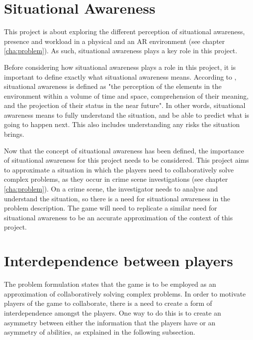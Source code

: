 
	\section{Situational Awareness} \label{sec:awareness}
		This project is about exploring the different perception of situational
		awareness, presence and workload in a physical and an AR environment
		(see chapter \ref{cha:problem}). As such, situational awareness plays a
		key role in this project.

		Before considering how situational awareness plays a role in this project,
		it is important to define exactly what situational awareness means.
		According to \cite{endsley}, situational awareness is defined as "the
		perception of the elements in the environment within a volume of time and
		space, comprehension of their meaning, and the projection of their status in
		the near future". In other words, situational awareness means to
		fully understand the situation, and be able to predict what is going to
		happen next. This also includes understanding any risks the situation brings.

		Now that the concept of situational awareness has been defined, the
		importance of situational awareness for this project needs to be considered.
		This project aims to approximate a situation in which the players need to
		collaboratively solve complex problems, as they occur in crime scene
		investigations (see chapter \ref{cha:problem}). On a crime scene, the
		investigator needs to analyse and understand the situation, so there is a
		need for situational awareness in the problem description. The game will need
		to replicate a similar need for situational awareness to be an accurate
		approximation of the context of this project.

	\section{Interdependence between players} \label{sec:interdependence}
		The problem formulation states that the game is to be employed as an
		approximation of collaboratively solving complex problems. In order to
		motivate players of the game to collaborate, there is a need to create
		a form of interdependence amongst the players. One way to do this is to
		create an asymmetry between either the information that the players have or
		an asymmetry of abilities, as explained in the following subsection.
